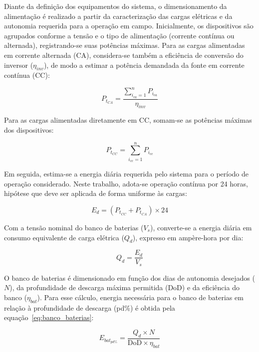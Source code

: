 Diante da definição dos equipamentos do sistema, o dimensionamento da alimentação é realizado a partir da caracterização das cargas elétricas e da autonomia requerida para a operação em campo. Inicialmente, os dispositivos são agrupados conforme a tensão e o tipo de alimentação (corrente contínua ou alternada), registrando-se suas potências máximas. Para as cargas alimentadas em corrente alternada (CA), considera-se também a eficiência de conversão do inversor ($\eta_{inv}$), de modo a estimar a potência demandada da fonte em corrente contínua (CC):

\begin{equation}
  P_{t_{CA}} = \frac{\sum_{i_{ca}=1}^{n} P_{i_{ca}}}{\eta_{inv}}
  \label{eq:potencia_total_ca}
\end{equation}

Para as cargas alimentadas diretamente em CC, somam-se as potências máximas dos dispositivos:

\begin{equation}
  P_{t_{CC}} = \sum_{i_{cc}=1}^{n} P_{i_{cc}}
  \label{eq:potencia_total_cc}
\end{equation}

Em seguida, estima-se a energia diária requerida pelo sistema para o período de operação considerado. Neste trabalho, adota-se operação contínua por 24 horas, hipótese que deve ser aplicada de forma uniforme às cargas:

\begin{equation}
  E_{d} = (P_{t_{CC}} + P_{t_{CA}}) \times 24
  \label{eq:energia_diaria}
\end{equation}

Com a tensão nominal do banco de baterias ($V_s$), converte-se a energia diária em consumo equivalente de carga elétrica ($Q_d$), expresso em ampère-hora por dia:

\begin{equation}
  Q_{d} = \frac{E_{d}}{V_{s}}
  \label{eq:carga_diaria}
\end{equation}

O banco de baterias é dimensionado em função dos dias de autonomia desejados ($N$), da profundidade de descarga máxima permitida ($\text{DoD}$) e da eficiência do banco ($\eta_{bat}$). Para esse cálculo, energia necessária para o banco de baterias em relação à profundidade de descarga (pd\%) é obtida pela equação~\eqref{eq:banco_baterias}:

\begin{equation}
  E_{bat_{pd\%}} = \frac{Q_{d} \times N}{\text{DoD} \times \eta_{bat}}
  \label{eq:banco_baterias}
\end{equation}

